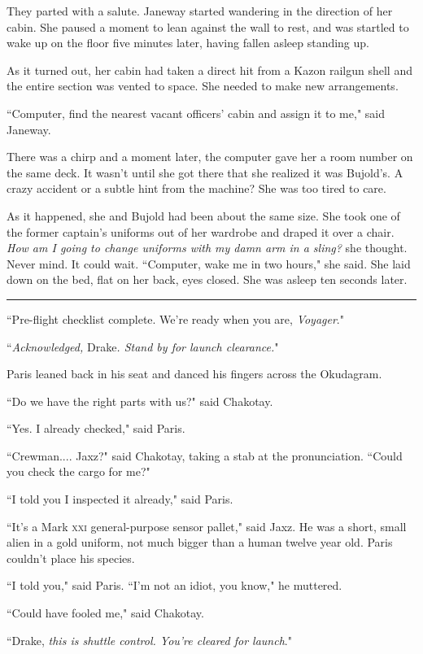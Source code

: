 \documentclass[twoside,letterpaper,12pt]{memoir}
\begin{document}
They parted with a salute. Janeway started wandering in the direction of her cabin. She paused a moment to lean against the wall to rest, and was startled to wake up on the floor five minutes later, having fallen asleep standing up.

As it turned out, her cabin had taken a direct hit from a Kazon railgun shell and the entire section was vented to space. She needed to make new arrangements.

``Computer, find the nearest vacant officers' cabin and assign it to me," said Janeway.

There was a chirp and a moment later, the computer gave her a room number on the same deck. It wasn't until she got there that she realized it was Bujold's. A crazy accident or a subtle hint from the machine? She was too tired to care.

As it happened, she and Bujold had been about the same size. She took one of the former captain's uniforms out of her wardrobe and draped it over a chair. \textit{How am I going to change uniforms with my damn arm in a sling?} she thought. Never mind. It could wait. ``Computer, wake me in two hours," she said. She laid down on the bed, flat on her back, eyes closed. She was asleep ten seconds later.

\fancybreak{\rule{3cm}{0.4 pt}}
``Pre-flight checklist complete. We're ready when you are, \textit{Voyager}."

``\textit{Acknowledged, }Drake\textit{. Stand by for launch clearance.}"

Paris leaned back in his seat and danced his fingers across the Okudagram.

``Do we have the right parts with us?" said Chakotay.

``Yes. I already checked," said Paris.

``Crewman.... Jaxz?" said Chakotay, taking a stab at the pronunciation. ``Could you check the cargo for me?"

``I told you I inspected it already," said Paris.

``It's a Mark \textsc{xxi} general-purpose sensor pallet," said Jaxz. He was a short, small alien in a gold uniform, not much bigger than a human twelve year old. Paris couldn't place his species.

``I told you," said Paris. ``I'm not an idiot, you know," he muttered.

``Could have fooled me," said Chakotay.

``Drake, \textit{this is shuttle control. You're cleared for launch}."
\end{document}
